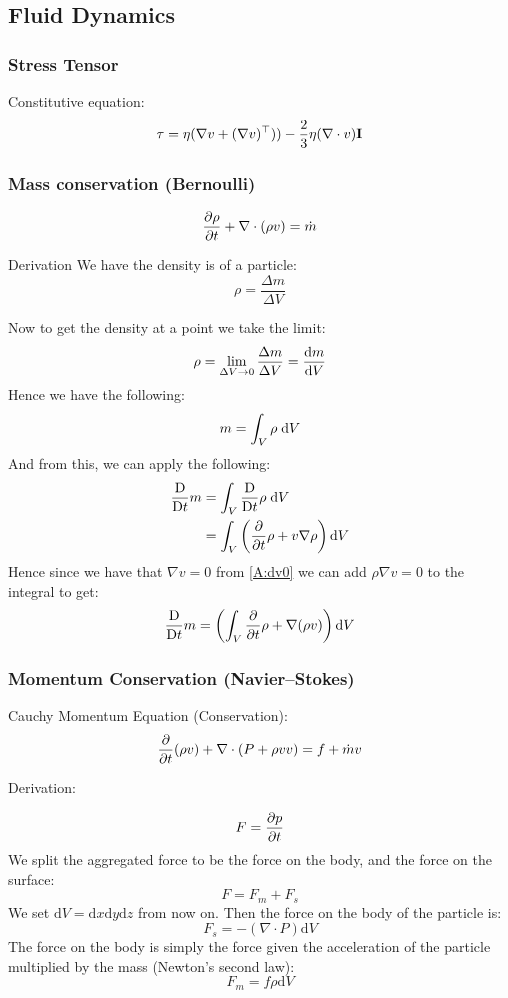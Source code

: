 \documentclass[main.tex]{subfiles}
\begin{document}
\subsection{Fluid Dynamics}
\subsubsection{Stress Tensor}
Constitutive equation:
\begin{equation}
    \tau = \eta(\nabla v + (\nabla v)^\top)) - \frac{2}{3}\eta(\nabla\cdot v)\mathbf{I}
    \label{eq:tau}
\end{equation}

\subsubsection{Mass conservation (Bernoulli)}
\begin{equation}
    \frac{\partial \rho}{\partial t} + \nabla \cdot (\rho v) = \dot{m}
    \label{eq:bernoulli}
\end{equation}

Derivation
We have the density is of a particle:
$$\rho = \frac{\Delta m}{\Delta V}$$

Now to get the density at a point we take the limit:
\begin{align*}
    \rho = \lim_{\Delta V \to 0}\frac{\Delta m}{\Delta V} = \frac{\text{d} m}{\text{d} V}
\end{align*}
Hence we have the following:
\begin{align*}
    m = \int_V \rho \;\text{d} V
\end{align*}
And from this, we can apply the following:
\begin{align*}
    \frac{\text{D} }{\text{D} t}m &= \int_V \frac{\text{D} }{\text{D} t} \rho \; \text{d} V \\
    &= \int_V \left(\frac{\partial }{\partial t}\rho + v\nabla \rho\right)\text{d} V
\end{align*}
Hence since we have that $\nabla v = 0$ from \autoref{A:dv0} we can add $\rho\nabla v = 0$ to the integral to get:
$$\frac{\text{D} }{\text{D} t}m = \left(\int_V \frac{\partial }{\partial t}\rho + \nabla(\rho v)\right)\text{d} V$$

\subsubsection{Momentum Conservation (Navier–Stokes)}
Cauchy Momentum Equation (Conservation):
$$\frac{\partial }{\partial t}(\rho v) + \nabla\cdot (P + \rho vv) = f + \dot{m}v$$

Derivation:

$$F = \frac{\partial p}{\partial t}$$
We split the aggregated force to be the force on the body, and the force on the surface:
$$F = F_m + F_s$$
We set $\text{d}V = \text{d}x\text{d}y\text{d}z$ from now on. Then the force on the body of the particle is: 
$$F_s = -(\nabla\cdot P)\text{d}V$$
The force on the body is simply the force given the acceleration of the particle multiplied by the mass (Newton's second law):
$$F_m = f\rho \text{d}V$$
\end{document}
